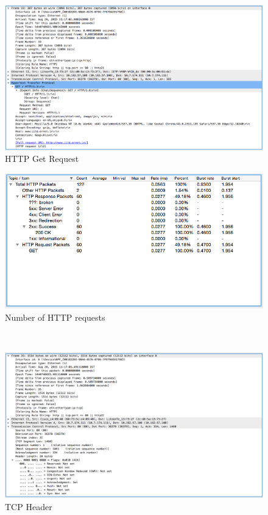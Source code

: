 \documentclass[12pt]{article}
\begin{document}
\begin{figure}[h!]
\includegraphics[scale=0.38]{../Screenshots/http-get-request.png}
\caption{HTTP Get Request}
\end{figure}
\begin{figure}[h!]
\centerline {\includegraphics[scale=0.4]{../Screenshots/num-http-requests.png}}
\caption{Number of HTTP requests}
\end{figure}
~\\
\begin{figure}[h]
\includegraphics[scale=0.38]{../Screenshots/tcp-header.png}
\caption{TCP Header}
\end{figure}
\end{document}
